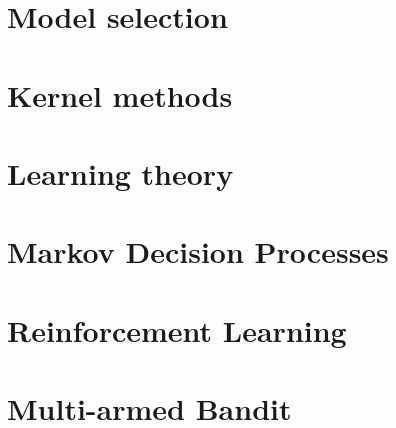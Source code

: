 \documentclass[12pt, a4paper]{report}
\begin{document}
    \chapter{Model selection}
    
    
    

    \chapter{Kernel methods}
    
    
    

    \chapter{Learning theory}




    \chapter{Markov Decision Processes}
    



    \chapter{Reinforcement Learning}


    \chapter{Multi-armed Bandit}



    
\end{document}
